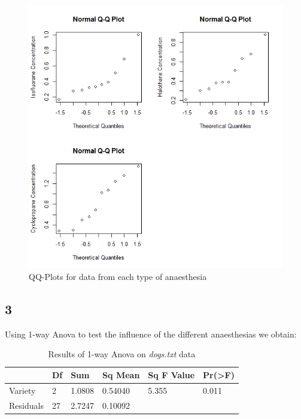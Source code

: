 \documentclass{article}
\begin{document}
    \begin{figure}[H]
    \centering
      \includegraphics[scale=0.4]{../results/4_2.png}
      \caption{QQ-Plots for data from each type of anaesthesia}
      \label{fig:qq dog}
    \end{figure}
    
    \subsection*{3}
    Using 1-way Anova to test the influence of the different anaesthesias we obtain:
    
    \begin{table}[H]
    \begin{center}
    \begin{tabular}{l|lllll}
        \hline 
        & Df & Sum & Sq Mean & Sq F Value & Pr(>F) \\
        \hline
        Variety & 2 & 1.0808 & 0.54040 & 5.355 & 0.011 \\
        \hline
        Residuals & 27 & 2.7247 & 0.10092 \\
        \hline
    \end{tabular}
    \caption{Results of 1-way Anova on \textit{dogs.txt} data}
    \label{table:2anova}
    \end{center}
    \end{table}
    
\end{document}
